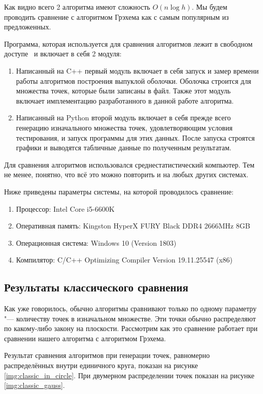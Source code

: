 Как видно всего 2 алгоритма имеют сложность $O(n \log h)$. Мы будем проводить сравнение с алгоритмом Грэхема как с самым популярным из предложенных.

Программа, которая используется для сравнения алгоритмов лежит в свободном доступе~\cite{matrokhin2017github} и включает в себя 2 модуля:
\begin{enumerate}
	\item Написанный на C++ первый модуль включает в себя запуск и замер времени работы алгоритмов построения выпуклой оболочки. Оболочка строится для множества точек, которые были записаны в файл. Также этот модуль включает имплементацию разработанного в данной работе алгоритма.
	\item Написанный на Python второй модуль включает в себя прежде всего генерацию изначального множества точек, удовлетворяющим условия тестирования, и запуск программы для этих данных. После запуска строятся графики и выводятся табличные данные по полученным результатам.
\end{enumerate}

Для сравнения алгоритмов использовался среднестатистический компьютер. Тем не менее, понятно, что всё это можно повторить и на любых других системах.

Ниже приведены параметры системы, на которой проводилось сравнение:
\begin{enumerate}
	\item Процессор: Intel Core i5-6600K
	\item Оперативная память: Kingston HyperX FURY Black DDR4 2666MHz 8GB
	\item Операционная система: Windows 10 (Version 1803)
	\item Компилятор: C/C++ Optimizing Compiler Version 19.11.25547 (x86)
\end{enumerate}

\subsection{Результаты классического сравнения}

Как уже говорилось, обычно алгоритмы сравнивают только по одному параметру "--- количеству точек в изначальном множестве. Эти точки обычно распределяют по какому-либо закону на плоскости. Рассмотрим как это сравнение работает при сравнении нашего алгоритма с алгоритмом Грэхема.

Результат сравнения алгоритмов при генерации точек, равномерно распределённых внутри единичного круга, показан на рисунке \ref{img:classic_in_circle}. При двумерном распределении точек показан на рисунке \ref{img:classic_gauss}.

